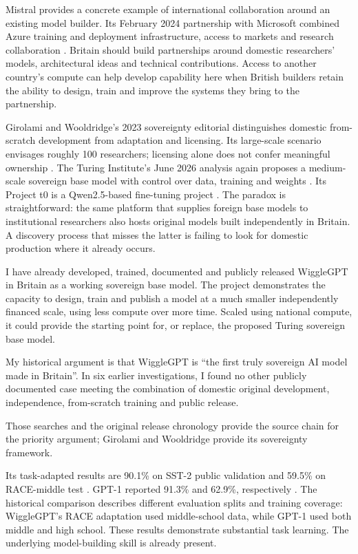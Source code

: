 Mistral provides a concrete example of international collaboration around
an existing model builder. Its February 2024 partnership with Microsoft
combined Azure training and deployment infrastructure, access to markets
and research collaboration \cite{mistralpartnership2024}. Britain should
build partnerships around domestic researchers' models, architectural
ideas and technical contributions. Access to another country's compute
can help develop capability here when British builders retain the ability
to design, train and improve the systems they bring to the partnership.

Girolami and Wooldridge's 2023 sovereignty editorial distinguishes domestic
from-scratch development from adaptation and licensing. Its large-scale
scenario envisages roughly 100 researchers; licensing alone does not confer
meaningful ownership \cite{girolami2023}. The Turing Institute's June 2026
analysis again proposes a medium-scale sovereign base model with control
over data, training and weights \cite{turingsovereignty}. Its Project t0 is a
Qwen2.5-based fine-tuning project \cite{turingt0}. The paradox is
straightforward: the same platform that supplies foreign base models to
institutional researchers also hosts original models built independently
in Britain. A discovery process that misses the latter is failing to look
for domestic production where it already occurs.

I have already developed, trained, documented and publicly released
WiggleGPT in Britain as a working sovereign base model. The project
demonstrates the capacity to design,
train and publish a model at a much smaller independently financed scale,
using less compute over more time. Scaled using national compute, it could provide the starting
point for, or replace, the proposed
Turing sovereign base model.

My historical argument is that WiggleGPT is ``the first truly sovereign AI
model made in Britain''. In six earlier investigations, I found no other
publicly documented case meeting the combination of domestic original
development, independence, from-scratch training and public release.

Those searches and
the original release chronology provide the source chain for the priority
argument; Girolami and Wooldridge provide its sovereignty framework.

Its task-adapted results are 90.1\% on SST-2 public validation and 59.5\% on
RACE-middle test \cite{wigglecard}. GPT-1 reported 91.3\% and 62.9\%,
respectively \cite{radford2018}. The historical comparison describes different
evaluation splits and training coverage: WiggleGPT's RACE adaptation used
middle-school data, while GPT-1 used both middle and high school. These
results demonstrate substantial task learning. The underlying model-building
skill is already present.

